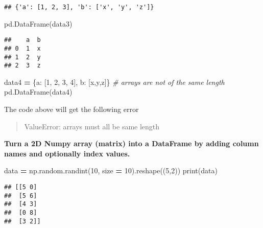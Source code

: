 \documentclass[
]{book}
\newenvironment{Shaded}{\begin{snugshade}}{\end{snugshade}}
\newcommand{\BuiltInTok}[1]{#1}
\newcommand{\CommentTok}[1]{\textcolor[rgb]{0.56,0.35,0.01}{\textit{#1}}}
\newcommand{\DecValTok}[1]{\textcolor[rgb]{0.00,0.00,0.81}{#1}}
\newcommand{\NormalTok}[1]{#1}
\newcommand{\OperatorTok}[1]{\textcolor[rgb]{0.81,0.36,0.00}{\textbf{#1}}}
\newcommand{\StringTok}[1]{\textcolor[rgb]{0.31,0.60,0.02}{#1}}
\begin{document}
\begin{verbatim}
## {'a': [1, 2, 3], 'b': ['x', 'y', 'z']}
\end{verbatim}

\begin{Shaded}
\begin{Highlighting}[]
\NormalTok{pd.DataFrame(data3)}
\end{Highlighting}
\end{Shaded}

\begin{verbatim}
##    a  b
## 0  1  x
## 1  2  y
## 2  3  z
\end{verbatim}

\begin{Shaded}
\begin{Highlighting}[]
\NormalTok{data4 }\OperatorTok{=}\NormalTok{ \{}\StringTok{\textquotesingle{}a\textquotesingle{}}\NormalTok{: [}\DecValTok{1}\NormalTok{, }\DecValTok{2}\NormalTok{, }\DecValTok{3}\NormalTok{, }\DecValTok{4}\NormalTok{], }\StringTok{\textquotesingle{}b\textquotesingle{}}\NormalTok{: [}\StringTok{\textquotesingle{}x\textquotesingle{}}\NormalTok{,}\StringTok{\textquotesingle{}y\textquotesingle{}}\NormalTok{,}\StringTok{\textquotesingle{}z\textquotesingle{}}\NormalTok{]\} }\CommentTok{\# arrays are not of the same length}
\NormalTok{pd.DataFrame(data4)}
\end{Highlighting}
\end{Shaded}

The code above will get the following error

\begin{quote}
ValueError: arrays must all be same length
\end{quote}

\textbf{Turn a 2D Numpy array (matrix) into a DataFrame by adding column names and optionally
index values.}

\begin{Shaded}
\begin{Highlighting}[]
\NormalTok{data }\OperatorTok{=}\NormalTok{ np.random.randint(}\DecValTok{10}\NormalTok{, size }\OperatorTok{=} \DecValTok{10}\NormalTok{).reshape((}\DecValTok{5}\NormalTok{,}\DecValTok{2}\NormalTok{))}
\BuiltInTok{print}\NormalTok{(data)}
\end{Highlighting}
\end{Shaded}

\begin{verbatim}
## [[5 0]
##  [5 6]
##  [4 3]
##  [0 8]
##  [3 2]]
\end{verbatim}
\end{document}
